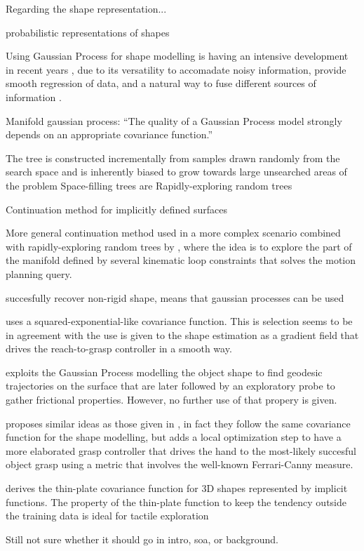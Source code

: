 Regarding the shape representation...

\citet{Faria2010Probabilistic} probabilistic representations of shapes

Using Gaussian Process for shape modelling is having an intensive development in recent years \citep{Mahler2015Grasp,Rosales2014Active,Bjorkman2013Enhancing,Dragiev2011Gaussian}, due to its versatility to accomadate noisy information, provide smooth regression of data, and a natural way to fuse different sources of information \citep{Rasmussen2006Gaussian}.

Manifold gaussian process: \citet{Calandra2014Manifold} ``The quality of a Gaussian Process model strongly depends on an appropriate covariance function.''

The tree is constructed incrementally from samples drawn randomly from the search space and is inherently biased to grow towards large unsearched areas of the problem
Space-filling trees are 
Rapidly-exploring random trees \citet{LaValle2011Motion}

Continuation method for implicitly defined surfaces \citet{Henderson1993COMPUTING}

More general continuation method used in a more complex scenario combined with rapidly-exploring random trees \citep{LaValle2011Motion} by \citet{Jaillet2013Path}, where the idea is to explore the part of the manifold defined by several kinematic loop constraints that solves the motion planning query.

\citet{Zhu2009Nonrigid} succesfully recover non-rigid shape, means that gaussian processes can be used

\citet{Dragiev2011Gaussian} uses a squared-exponential-like covariance function. This is selection seems to be in agreement with the use is given to the shape estimation as a gradient field that drives the reach-to-grasp controller in a smooth way.

\citet{Rosales2014Active} exploits the Gaussian Process modelling the object shape to find geodesic trajectories on the surface that are later followed by an exploratory probe to gather frictional properties. However, no further use of that propery is given.

\citet{Mahler2015Grasp} proposes similar ideas as those given in \citet{Dragiev2011Gaussian}, in fact they follow the same covariance function for the shape modelling, but adds a local optimization step to have a more elaborated grasp controller that drives the hand to the most-likely succesful object grasp using a metric that involves the well-known Ferrari-Canny measure.

\citet{Williams2007Gaussian} derives the thin-plate covariance function for 3D shapes represented by implicit functions. The property of the thin-plate function to keep the tendency outside the training data is ideal for tactile exploration~\citep[Fig.~2]{Williams2007Gaussian}

Still not sure whether it should go in intro, soa, or background.
\citet{Li2016Dexterous}